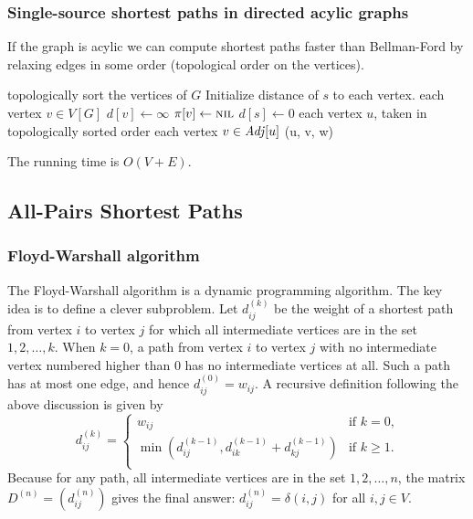 \documentclass[12pt]{article}
\begin{document}
\subsubsection{Single-source shortest paths in directed acylic graphs}

If the graph is acylic we can compute shortest paths faster than
Bellman-Ford by relaxing edges in some order (topological order on the vertices).

\begin{codebox}
\li topologically sort the vertices of $G$
\li \Comment Initialize distance of $s$ to each vertex.
\li \For each vertex $v \in V[G]$
\li     \Do $d[v] \gets \infty$
\li         $\pi[v] \gets \textnormal{\scshape nil}$
        \End
\li $d[s] \gets 0$
\li \For each vertex $u$, taken in topologically sorted order
\li     \Do \For each vertex $v \in \id{Adj}[u]$
\li             \Do {}(u, v, w)
                \End
        \End
\end{codebox}

The running time is $O(V+E)$.


\subsection{All-Pairs Shortest Paths}

\subsubsection{Floyd-Warshall algorithm}

The Floyd-Warshall algorithm is a dynamic programming algorithm.  The key
idea is to define a clever subproblem.  Let $d_{ij}^{(k)}$ be the weight of
a shortest path from vertex $i$ to vertex $j$ for which all intermediate
vertices are in the set ${1, 2, \ldots, k}$.  When $k = 0$, a path from
vertex $i$ to vertex $j$ with no intermediate vertex numbered higher than
$0$ has no intermediate vertices at all.  Such a path has at most one edge,
and hence $d_{ij}^{(0)} = w_{ij}$.  A recursive definition following the
above discussion is given by
\begin{displaymath}
d_{ij}^{(k)} = \left\{
    \begin{array}{ll}
        w_{ij}  & \textrm{if $k = 0$,} \\
        \min{\left(d_{ij}^{(k-1)},d_{ik}^{(k-1)}+d_{kj}^{(k-1)}\right)} & \textrm{if $k
                \geq 1$.} \\
    \end{array} \right.
\end{displaymath}
Because for any path, all intermediate vertices are in the set ${1, 2,
\ldots, n}$, the matrix $D^{(n)} = (d_{ij}^{(n)})$ gives the final answer:
$d_{ij}^{(n)} = \delta(i,j)$ for all $i, j \in V$.
\end{document}

